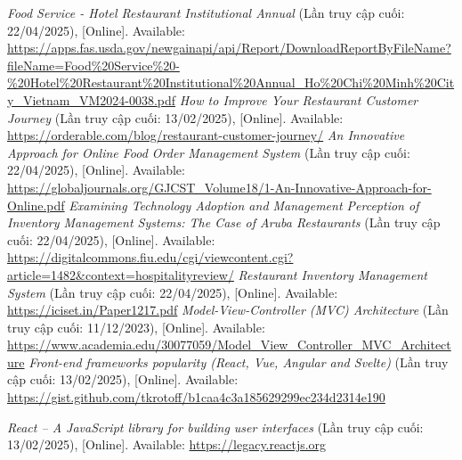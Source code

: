 \documentclass[12pt, a4paper]{article}
\begin{document}

\newpage

\newpage

\newpage

\newpage

\newpage

\newpage

\newpage






\newpage

\renewcommand{\refname}{\textbf{TÀI LIỆU THAM KHẢO}}
\begin{thebibliography}{}
 \textit{Food Service - Hotel Restaurant Institutional Annual
} (Lần truy cập cuối: 22/04/2025), [Online]. Available: \url{https://apps.fas.usda.gov/newgainapi/api/Report/DownloadReportByFileName?fileName=Food\%20Service%20-\%20Hotel\%20Restaurant%20Institutional\%20Annual_Ho\%20Chi\%20Minh\%20City_Vietnam_VM2024-0038.pdf}
 \textit{How to Improve Your Restaurant Customer Journey
} (Lần truy cập cuối: 13/02/2025), [Online]. Available: \url{https://orderable.com/blog/restaurant-customer-journey/}
 \textit{An Innovative Approach for Online Food Order Management System} (Lần truy cập cuối: 22/04/2025), [Online]. Available: \url{https://globaljournals.org/GJCST_Volume18/1-An-Innovative-Approach-for-Online.pdf}
 \textit{Examining Technology Adoption and Management Perception of Inventory Management Systems: The Case of Aruba Restaurants
} (Lần truy cập cuối: 22/04/2025), [Online]. Available: \url{https://digitalcommons.fiu.edu/cgi/viewcontent.cgi?article=1482&context=hospitalityreview/}
 \textit{Restaurant Inventory Management System
} (Lần truy cập cuối: 22/04/2025), [Online]. Available: \url{https://iciset.in/Paper1217.pdf}
 \textit{Model-View-Controller (MVC) Architecture} (Lần truy cập cuối: 11/12/2023), [Online]. Available: \url{https://www.academia.edu/30077059/Model_View_Controller_MVC_Architecture}
 \textit{Front-end frameworks popularity (React, Vue, Angular and Svelte)} (Lần truy cập cuối: 13/02/2025), [Online]. Available: \url{https://gist.github.com/tkrotoff/b1caa4c3a185629299ec234d2314e190}

 \textit{React – A JavaScript library for building user interfaces} (Lần truy cập cuối: 13/02/2025), [Online]. Available: \url{https://legacy.reactjs.org}


\end{thebibliography}
\end{document}
